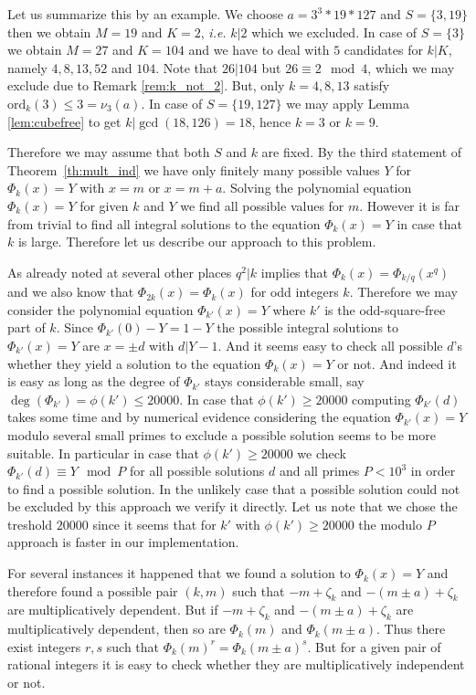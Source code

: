 \documentclass{amsart}
\theoremstyle{plain}
\numberwithin{equation}{section}
\theoremstyle{remark}
\begin{document}
Let us summarize this by an example. We choose $a=3^3*19*127$ and $S=\{3,19\}$ then we obtain $M=19$ and $K=2$, \textit{i.e.} $k|2$ which we excluded. In  
case of $S=\{3\}$ we obtain $M=27$ and $K=104$ and we have to deal with $5$ candidates for $k|K$, namely $4,8,13,52$ and $104$. Note that $26|104$ but $26\equiv 
2 \mod 4$, which we may exclude due to Remark \ref{rem:k_not_2}. But,
only $k=4,8,13$ satisfy ${\mathrm{ord}}_k(3)\leq 3=\nu_3(a)$. In case of
$S=\{19,127\}$ we may apply Lemma \ref{lem:cubefree} to get 
$k|\gcd(18,126)=18$, hence $k=3$ or $k=9$.

Therefore we may assume that both $S$ and $k$ are fixed. By the third
statement of Theorem~\ref{th:mult_ind} we have only finitely many
possible values $Y$ for $\Phi_k(x)=Y$ with $x=m$ or $x=m+a$. Solving
the polynomial equation $\Phi_k(x)=Y$ for given $k$ and $Y$ we find
all possible values for $m$. However it is far from trivial to find
all integral solutions to the equation $\Phi_k(x)=Y$ in case that $k$
is large. Therefore let us describe our approach to this problem.

As already noted at several other places  $q^2|k$ implies that $\Phi_k(x)=\Phi_{k/q}(x^q)$ and we also know that $\Phi_{2k}(x)=\Phi_k(x)$ for odd integers $k$. 
Therefore we may consider the polynomial equation $\Phi_{k'}(x)=Y$ where $k'$ is the odd-square-free part of $k$. Since 
$\Phi_{k'}(0)-Y=1-Y$ the possible integral solutions to $\Phi_{k'}(x)=Y$ are $x=\pm d$ with $d|Y-1$. And it seems easy to check all possible $d$'s whether they
yield a solution to the equation $\Phi_k(x)=Y$ or not. And indeed it is easy as long as the degree of $\Phi_{k'}$ stays considerable small, say 
$\deg(\Phi_{k'})=\phi(k')\leq 20000$. In case that 
$\phi(k')\geq 20000$ computing $\Phi_{k'}(d)$ takes some time and by numerical evidence considering the equation $\Phi_{k'}(x)=Y$ modulo several small primes 
to exclude a possible solution seems to be more suitable. In particular in case that $\phi(k')\geq 20000$ we check  $\Phi_{k'}(d)\equiv Y \mod P$ for all 
possible solutions $d$ and all primes $P<10^3$ in order to find a possible solution. In the unlikely case that a possible solution could not be excluded by 
this approach we verify it directly. Let us note that we chose the treshold $20000$ since it seems that for $k'$ with $\phi(k')\geq 20000$ the modulo $P$ 
approach is faster in our implementation.

For several instances it happened that we found a solution to $\Phi_k(x)=Y$ and therefore found a possible pair $(k,m)$ such that $-m+\zeta_k$ and 
$-(m\pm a)+\zeta_k$ are multiplicatively dependent. But if $-m+\zeta_k$ and $-(m\pm a)+\zeta_k$ are multiplicatively dependent, then so are $\Phi_k(m)$ and 
$\Phi_k(m\pm a)$. Thus there exist integers $r,s$ such that $\Phi_k(m)^r=\Phi_k(m\pm a)^s$. But for a given pair of rational integers it is easy to check 
whether they are multiplicatively independent or not. 
\end{document}
